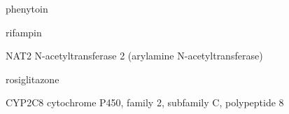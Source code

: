 \documentclass{resume} %
\begin{document}
\begin{rSection}{ phenytoin }
\end{rSection}\begin{rSection}{ rifampin }
\item[]
\begin{rSubsection}{ NAT2 }{ N-acetyltransferase 2 (arylamine N-acetyltransferase) }{}{}
\item[]


\end{rSubsection}

\end{rSection}\begin{rSection}{ rosiglitazone }
\item[]
\begin{rSubsection}{ CYP2C8 }{ cytochrome P450, family 2, subfamily C, polypeptide 8 }{}{}
\item[]


\end{rSubsection}


\end{rSection}
\end{document}
